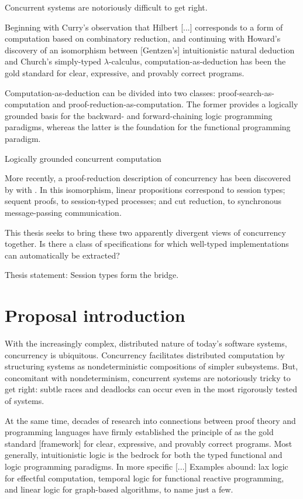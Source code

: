 Concurrent systems are notoriously difficult to get right.

Beginning with Curry's observation that Hilbert [...] corresponds to a form of computation based on combinatory reduction\autocite{??}, and continuing with Howard's discovery of an isomorphism between [Gentzen's] intuitionistic natural deduction and Church's simply-typed $\lambda$-calculus, computation-as-deduction has been the gold standard for clear, expressive, and provably correct programs.

Computation-as-deduction can be divided into two classes: proof-search-as-computation and proof-reduction-as-computation.
The former provides a logically grounded basis for the backward- and forward-chaining logic programming paradigms, whereas the latter is the foundation for the functional programming paradigm.

Logically grounded concurrent computation 

More recently, a proof-reduction description of concurrency has been discovered by \textcite{??} with \textcite{??}.
In this isomorphism, linear propositions correspond to session types; sequent proofs, to session-typed processes; and cut reduction, to synchronous message-passing communication.

This thesis seeks to bring these two apparently divergent views of concurrency together.
Is there a class of specifications for which well-typed implementations can automatically be extracted?

Thesis statement: Session types form the bridge. 


\section{Proposal introduction}

With the increasingly complex, distributed nature of today's software systems, concurrency is ubiquitous.
Concurrency facilitates distributed computation by structuring systems as nondeterministic compositions of simpler subsystems.
But, concomitant with nondeterminism, concurrent systems are notoriously tricky to get right:
subtle races and deadlocks can occur even in the most rigorously tested of systems.

At the same time, decades of research into connections between proof theory and programming languages have firmly established the principle of  as the gold standard [framework] for clear, expressive, and provably correct programs.
Most generally, intuitionistic logic is the bedrock for both the typed functional\autocite{Martin-Lof:LMPS80} and logic programming\autocites{Miller+:PAL91}{Andreoli:JLC92} paradigms.
In more specific [...]
Examples abound: lax logic for effectful computation\autocite{Benton:JFP98}, temporal logic for functional reactive programming\autocite{Jeffrey:PLPV12}, and linear logic for graph-based algorithms\autocite{Cruz+:ICLP14}, to name just a few.

